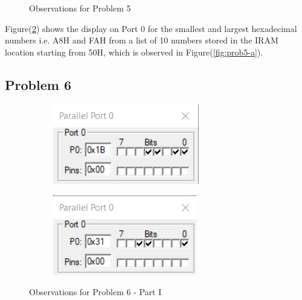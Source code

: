 \documentclass{lab_sheet}
\begin{document}
\begin{figure}[H]
\begin{subfigure}{.5\textwidth}
  \label{fig:prob5-c}
  \caption{}
\end{subfigure}
\caption{Observations for Problem 5}
\label{fig:prob5}
\end{figure}
Figure(\ref{fig:prob5}) shows the display on Port 0 for the smallest and largest hexadecimal numbers i.e. A8H and FAH from a list of 10 numbers stored in the IRAM location starting from 50H, which is observed in Figure(\ref{fig:prob5-a}).
\subsection*{Problem 6}
\begin{figure}[H]
\begin{subfigure}{.5\textwidth}
  \centering
  \includegraphics[frame,width=.8\linewidth]{../Figures/1_6_a.png}  
  \caption{}
   \label{fig:prob6a-a}
\end{subfigure}
\begin{subfigure}{.5\textwidth}
  \centering
  \includegraphics[frame,width=.8\linewidth]{../Figures/1_6_b.png}  
  \caption{}
  \label{fig:prob6a-b}
\end{subfigure}
\caption{Observations for Problem 6 - Part I}
\label{fig:prob6a}
\end{figure}
\end{document}
